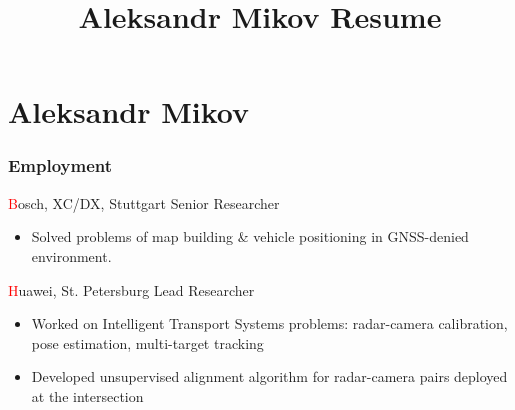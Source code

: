 \documentclass{tccv}
\title{Aleksandr Mikov Resume}
\makeatletter
\newcommand{\about@me}{}
\newcommand{\aboutme}[1]{\renewcommand{\about@me}{\subsection{About Me}#1}}
\makeatother
\begin{document}
\aboutme{\center{\textcolor{forestgreen}{\textbf{PhD}}, Researcher and algorithm developer in the indoor and outdoor navigation field\\with an emphasis on automotive and pedestrian applications.}}
\part{Aleksandr Mikov}


\section{Employment}

\begin{eventlist}
     {\textcolor{red}{B}osch, XC/DX, Stuttgart}
     {Senior Researcher}
\begin{itemize}
     \item Solved problems of map building \& vehicle positioning in GNSS-denied environment.
\end{itemize}

     {\textcolor{red}{H}uawei, St. Petersburg}
     {Lead Researcher}
\begin{itemize}
     \item Worked on Intelligent Transport Systems problems: radar-camera calibration, pose estimation, multi-target tracking
     \item Developed unsupervised alignment algorithm for radar-camera pairs deployed at the intersection
\end{itemize}


\end{eventlist}
\end{document}
